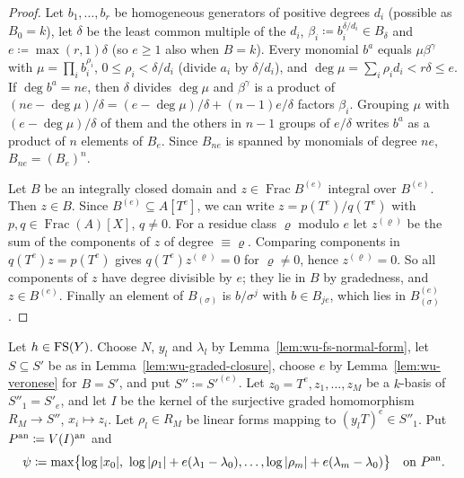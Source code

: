 \begin{proof}
Let $b_1,\dots,b_r$ be homogeneous generators of positive degrees $d_i$ (possible as $B_0=k$), let $\delta$ be the
least common multiple of the $d_i$, $\beta_i\coloneqq b_i^{\delta/d_i}\in B_\delta$ and $e\coloneqq\max(r,1)\delta$ (so $e\ge1$ also when $B=k$). Every
monomial $b^a$ equals $\mu\beta^\gamma$ with $\mu=\prod_ib_i^{\rho_i}$, $0\le\rho_i<\delta/d_i$ (divide $a_i$ by
$\delta/d_i$), and $\deg\mu=\sum_i\rho_id_i<r\delta\le e$. If $\deg b^a=ne$, then $\delta$ divides $\deg\mu$ and
$\beta^\gamma$ is a product of $(ne-\deg\mu)/\delta=(e-\deg\mu)/\delta+(n-1)e/\delta$ factors $\beta_i$. Grouping
$\mu$ with $(e-\deg\mu)/\delta$ of them and the others in $n-1$ groups of $e/\delta$ writes $b^a$ as a product of
$n$ elements of $B_e$. Since $B_{ne}$ is spanned by monomials of degree $ne$, $B_{ne}=(B_e)^n$.

Let $B$ be an integrally closed domain and $z\in\operatorname{Frac}B^{(e)}$ integral over $B^{(e)}$. Then $z\in B$.
Since $B^{(e)}\subseteq A[T^e]$, we can write $z=p(T^e)/q(T^e)$ with $p,q\in\operatorname{Frac}(A)[X]$, $q\ne0$. For
a residue class $\varrho$ modulo $e$ let $z^{(\varrho)}$ be the sum of the components of $z$ of degree $\equiv\varrho$.
Comparing components in $q(T^e)z=p(T^e)$ gives $q(T^e)z^{(\varrho)}=0$ for $\varrho\ne0$, hence $z^{(\varrho)}=0$.
So all components of $z$ have degree divisible by $e$; they lie in $B$ by gradedness, and $z\in B^{(e)}$.
Finally an element of $B_{(\sigma)}$ is $b/\sigma^j$ with $b\in B_{je}$, which lies in $B^{(e)}_{(\sigma)}$.
\end{proof}

\begin{definition}\label{def:wu-compactification}
\leanok
{}
Let $h\in\mathrm{FS}(Y)$. Choose $N$, $y_l$ and $\lambda_l$ by Lemma~\ref{lem:wu-fs-normal-form}, let $S\subseteq S'$ be as in
Lemma~\ref{lem:wu-graded-closure}, choose $e$ by Lemma~\ref{lem:wu-veronese} for $B=S'$, and put
$S''\coloneqq S'^{(e)}$. Let $z_0=T^e,z_1,\dots,z_M$ be a $k$-basis of $S''_1=S'_e$, and let $I$ be the kernel of
the surjective graded homomorphism $R_M\to S''$, $x_i\mapsto z_i$. Let $\rho_l\in R_M$ be linear forms mapping to
$(y_lT)^e\in S''_1$. Put $P^{\mathrm{an}}\coloneqq V(I)^{\mathrm{an}}$ and
\[
\psi\coloneqq\max\bigl\{\log|x_0|,\ \log|\rho_1|+e(\lambda_1-\lambda_0),\dots,\log|\rho_m|+e(\lambda_m-\lambda_0)\bigr\}
\quad\text{on }P^\an.
\]
\end{definition}

